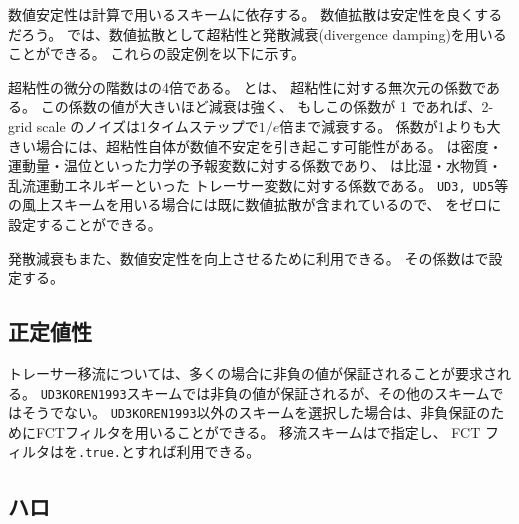 数値安定性は計算で用いるスキームに依存する。
数値拡散は安定性を良くするだろう。
\scalerm では、数値拡散として超粘性と発散減衰(divergence damping)を用いることができる。
これらの設定例を以下に示す。

超粘性の微分の階数はの4倍である。
とは、
超粘性に対する無次元の係数である。
この係数の値が大きいほど減衰は強く、
もしこの係数が 1 であれば、2-grid scale のノイズは1タイムステップで$1/e$倍まで減衰する。
係数が1よりも大きい場合には、超粘性自体が数値不安定を引き起こす可能性がある。
は密度・運動量・温位といった力学の予報変数に対する係数であり、
は比湿・水物質・乱流運動エネルギーといった
トレーサー変数に対する係数である。
\verb|UD3, UD5|等の風上スキームを用いる場合には既に数値拡散が含まれているので、
をゼロに設定することができる。

発散減衰もまた、数値安定性を向上させるために利用できる。
その係数はで設定する。

\subsection{正定値性}

トレーサー移流については、多くの場合に非負の値が保証されることが要求される。
\verb|UD3KOREN1993|スキームでは非負の値が保証されるが、その他のスキームではそうでない。
\verb|UD3KOREN1993|以外のスキームを選択した場合は、非負保証のためにFCTフィルタを用いることができる。
移流スキームはで指定し、
FCT フィルタはを\verb|.true.|とすれば利用できる。

\subsection{ハロ}

